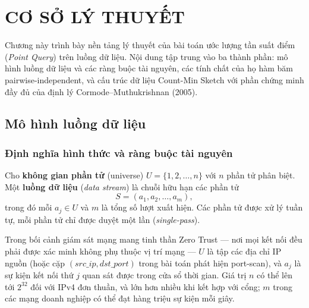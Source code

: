 
\chapter{CƠ SỞ LÝ THUYẾT}
\label{ch:theory}

Chương này trình bày nền tảng lý thuyết của bài toán ước lượng tần suất điểm (\textit{Point Query}) trên luồng dữ liệu. Nội dung tập trung vào ba thành phần: mô hình luồng dữ liệu và các ràng buộc tài nguyên, các tính chất của họ hàm băm pairwise-independent, và cấu trúc dữ liệu Count-Min Sketch \cite{cormode2005cms} với phần chứng minh đầy đủ của định lý Cormode--Muthukrishnan (2005).

\section{Mô hình luồng dữ liệu}

\subsection{Định nghĩa hình thức và ràng buộc tài nguyên}

\begin{definition}
\label{def:stream}
Cho \textbf{không gian phần tử} (universe) $U = \{1, 2, \ldots, n\}$ với $n$ phần tử phân biệt. Một \textbf{luồng dữ liệu} (\textit{data stream}) là chuỗi hữu hạn các phần tử
\begin{equation}
S = (a_1, a_2, \ldots, a_m),
\label{eq:stream-sequence}
\end{equation}
trong đó mỗi $a_j \in U$ và $m$ là tổng số lượt xuất hiện. Các phần tử được xử lý tuần tự, mỗi phần tử chỉ được duyệt một lần (\textit{single-pass}).
\end{definition}

Trong bối cảnh giám sát mạng mang tinh thần Zero Trust --- nơi mọi kết nối đều phải được xác minh không phụ thuộc vị trí mạng --- $U$ là tập các địa chỉ IP nguồn (hoặc cặp $(\textit{src\_ip}, \textit{dst\_port})$ trong bài toán phát hiện port-scan), và $a_j$ là sự kiện kết nối thứ $j$ quan sát được trong cửa sổ thời gian. Giá trị $n$ có thể lên tới $2^{32}$ đối với IPv4 đơn thuần, và lớn hơn nhiều khi kết hợp với cổng; $m$ trong các mạng doanh nghiệp có thể đạt hàng triệu sự kiện mỗi giây.

